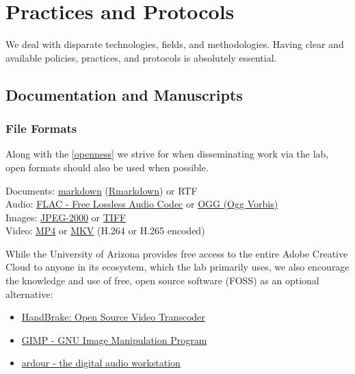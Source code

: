 \documentclass[]{tufte-book}
\providecommand{\tightlist}{%
  \setlength{\itemsep}{0pt}\setlength{\parskip}{0pt}}
\begin{document}
\hypertarget{protocols}{%
\chapter{Practices and Protocols}\label{protocols}}

We deal with disparate technologies, fields, and methodologies. Having clear and available policies, practices, and protocols is absolutely essential.

\hypertarget{docs-and-mans}{%
\section{Documentation and Manuscripts}\label{docs-and-mans}}

\hypertarget{fileformats}{%
\subsection{File Formats}\label{fileformats}}

Along with the \ref{openness} we strive for when disseminating work via the lab, open formats should also be used when possible.

Documents: \href{https://www.markdownguide.org/cheat-sheet}{markdown} (\href{https://uoepsy.github.io/usmr/cheatsheet/rmarkdown-2.0.pdf}{Rmarkdown}) or RTF\\
Audio: \href{https://xiph.org/flac/}{FLAC - Free Lossless Audio Codec} or \href{https://www.xiph.org/vorbis/}{OGG (Ogg Vorbis)}\\
Images: \href{https://jpeg.org/jpeg2000/index.html}{JPEG-2000} or \href{https://www.adobe.com/creativecloud/file-types/image/raster/tiff-file.html}{TIFF}\\
Video: \href{https://en.wikipedia.org/wiki/MPEG-4_Part_14}{MP4} or \href{https://en.wikipedia.org/wiki/Matroska}{MKV} (H.264 or H.265 encoded)

While the University of Arizona provides free access to the entire Adobe Creative Cloud to anyone in its ecosystem, which the lab primarily uses, we also encourage the knowledge and use of free, open source software (FOSS) as an optional alternative:

\begin{itemize}
\tightlist
\item
  \href{https://handbrake.fr/}{HandBrake: Open Source Video Transcoder}
\item
  \href{https://www.gimp.org/}{GIMP - GNU Image Manipulation Program}
\item
  \href{https://ardour.org/}{ardour - the digital audio workstation}
\end{itemize}
\end{document}
